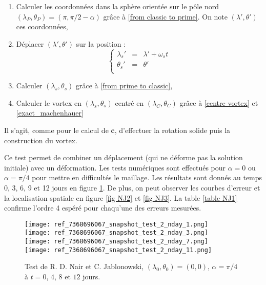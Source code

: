 \begin{enumerate}
\item Calculer les coordonnées dans la sphère orientée sur le pôle nord $(\lambda_P, \theta_P) = ( \pi, \pi/2 - \alpha)$ grâce à \eqref{from classic to prime}. On note $(\lambda', \theta')$ ces coordonnées,

\item Déplacer $(\lambda', \theta')$ sur la position :
\begin{equation}
\left\lbrace
\begin{array}{rcl}
\lambda_s' & = & \lambda' + \omega_s t\\
\theta_s' & = & \theta' \\
\end{array}
\right.
\end{equation}

\item Calculer $(\lambda_s, \theta_s)$ grâce à \eqref{from prime to classic},

\item Calculer le vortex en $(\lambda_s, \theta_s)$ centré en $(\lambda_C, \theta_C)$ grâce à \eqref{centre vortex} et \eqref{exact_machenhauer}
 
\end{enumerate}

Il s'agit, comme pour le calcul de $\mathbf{c}$, d'effectuer la rotation solide puis la construction du vortex.

Ce test permet de combiner un déplacement (qui ne déforme pas la solution initiale) avec un déformation. Les tests numériques sont effectués pour $\alpha = 0$ ou $\alpha = \pi/4$ pour mettre en difficultés le maillage. Les résultats sont donnés au temps 0, 3, 6, 9 et 12 jours en figure \ref{fig NJ1}. De plus, on peut observer les courbes d'erreur et la localisation spatiale en figure \ref{fig NJ2} et \ref{fig NJ3}. La table \ref{table NJ1} confirme l'ordre 4 espéré pour chaqu'une des erreurs mesurées.

\begin{figure}[ht]
\begin{center}
\texttt{[image: ref\_7368696067\_snapshot\_test\_2\_nday\_1.png]}\\
\texttt{[image: ref\_7368696067\_snapshot\_test\_2\_nday\_3.png]}\\
\texttt{[image: ref\_7368696067\_snapshot\_test\_2\_nday\_7.png]}\\
\texttt{[image: ref\_7368696067\_snapshot\_test\_2\_nday\_11.png]}\\
\caption{Test de R. D. Nair et C. Jablonowski, $(\lambda_0, \theta_0) = (0,0)$, $\alpha= \pi/4$ à $t=0$, $4$, $8$ et $12$ jours.}
\label{fig NJ1}
\end{center}
\end{figure}

